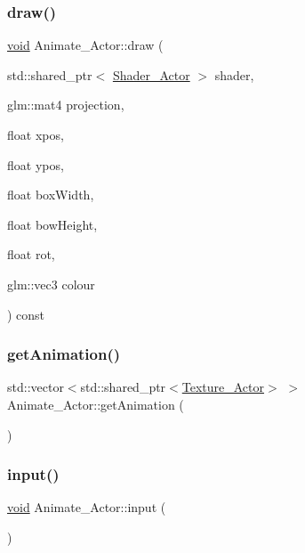 \subsubsection{\texorpdfstring{draw()}{draw()}\hspace{0.1cm}{\footnotesize\ttfamily [2/2]}}
{\footnotesize\ttfamily \hyperlink{imgui__impl__opengl3__loader_8h_ac668e7cffd9e2e9cfee428b9b2f34fa7}{void} Animate\+\_\+\+Actor\+::draw (\begin{DoxyParamCaption}\item[{std\+::shared\+\_\+ptr$<$ \hyperlink{classShader__Actor}{Shader\+\_\+\+Actor} $>$}]{shader,  }\item[{glm\+::mat4}]{projection,  }\item[{float}]{xpos,  }\item[{float}]{ypos,  }\item[{float}]{box\+Width,  }\item[{float}]{bow\+Height,  }\item[{float}]{rot,  }\item[{glm\+::vec3}]{colour }\end{DoxyParamCaption}) const}

\mbox{\label{classAnimate__Actor_a9105a1dae4c378c98dc9112476fde7f1}} 
\subsubsection{\texorpdfstring{get\+Animation()}{getAnimation()}}
{\footnotesize\ttfamily std\+::vector$<$std\+::shared\+\_\+ptr$<$\hyperlink{classTexture__Actor}{Texture\+\_\+\+Actor}$>$ $>$ Animate\+\_\+\+Actor\+::get\+Animation (\begin{DoxyParamCaption}{ }\end{DoxyParamCaption})\hspace{0.3cm}{\ttfamily [inline]}}

\mbox{\label{classAnimate__Actor_a0b1f2798694dfcc5bc6401d8ed2d95d7}} 
\subsubsection{\texorpdfstring{input()}{input()}}
{\footnotesize\ttfamily \hyperlink{imgui__impl__opengl3__loader_8h_ac668e7cffd9e2e9cfee428b9b2f34fa7}{void} Animate\+\_\+\+Actor\+::input (\begin{DoxyParamCaption}{ }\end{DoxyParamCaption})}

